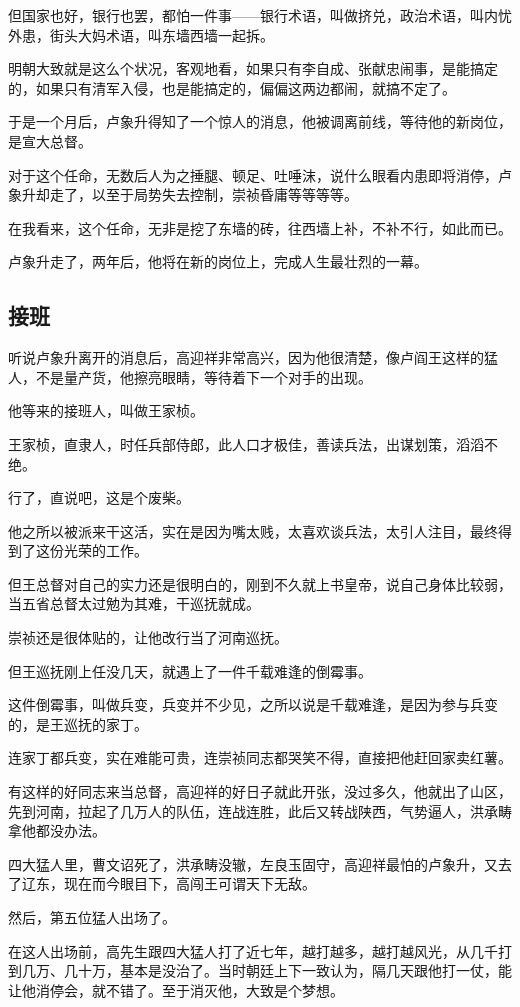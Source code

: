 \begin{multicols}{\theparacolNo}
但国家也好，银行也罢，都怕一件事——银行术语，叫做挤兑，政治术语，叫内忧外患，街头大妈术语，叫东墙西墙一起拆。

明朝大致就是这么个状况，客观地看，如果只有李自成、张献忠闹事，是能搞定的，如果只有清军入侵，也是能搞定的，偏偏这两边都闹，就搞不定了。

于是一个月后，卢象升得知了一个惊人的消息，他被调离前线，等待他的新岗位，是宣大总督。

对于这个任命，无数后人为之捶腿、顿足、吐唾沫，说什么眼看内患即将消停，卢象升却走了，以至于局势失去控制，崇祯昏庸等等等等。

在我看来，这个任命，无非是挖了东墙的砖，往西墙上补，不补不行，如此而已。

卢象升走了，两年后，他将在新的岗位上，完成人生最壮烈的一幕。

\subsection{接班}
听说卢象升离开的消息后，高迎祥非常高兴，因为他很清楚，像卢阎王这样的猛人，不是量产货，他擦亮眼睛，等待着下一个对手的出现。

他等来的接班人，叫做王家桢。

王家桢，直隶人，时任兵部侍郎，此人口才极佳，善读兵法，出谋划策，滔滔不绝。

行了，直说吧，这是个废柴。

他之所以被派来干这活，实在是因为嘴太贱，太喜欢谈兵法，太引人注目，最终得到了这份光荣的工作。

但王总督对自己的实力还是很明白的，刚到不久就上书皇帝，说自己身体比较弱，当五省总督太过勉为其难，干巡抚就成。

崇祯还是很体贴的，让他改行当了河南巡抚。

但王巡抚刚上任没几天，就遇上了一件千载难逢的倒霉事。

这件倒霉事，叫做兵变，兵变并不少见，之所以说是千载难逢，是因为参与兵变的，是王巡抚的家丁。

连家丁都兵变，实在难能可贵，连崇祯同志都哭笑不得，直接把他赶回家卖红薯。

有这样的好同志来当总督，高迎祥的好日子就此开张，没过多久，他就出了山区，先到河南，拉起了几万人的队伍，连战连胜，此后又转战陕西，气势逼人，洪承畴拿他都没办法。

四大猛人里，曹文诏死了，洪承畴没辙，左良玉固守，高迎祥最怕的卢象升，又去了辽东，现在而今眼目下，高闯王可谓天下无敌。

然后，第五位猛人出场了。

在这人出场前，高先生跟四大猛人打了近七年，越打越多，越打越风光，从几千打到几万、几十万，基本是没治了。当时朝廷上下一致认为，隔几天跟他打一仗，能让他消停会，就不错了。至于消灭他，大致是个梦想。


\end{multicols}
